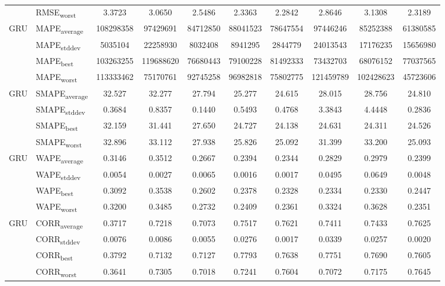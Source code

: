 {\begin{longtable}{l l c c c c c c c c}
 & RMSE\textsubscript{worst} & 3.3723 & 3.0650 & 2.5486 & 2.3363 & 2.2842 & 2.8646 & 3.1308 & 2.3189 \\
\cmidrule(lr){2-10}
\multirow{4}{*}{GRU} & MAPE\textsubscript{average} & 108298358 & 97429691 & 84712850 & 88041523 & 78647554 & 97446246 & 85252388 & 61380585 \\
 & MAPE\textsubscript{stddev} & 5035104 & 22258930 & 8032408 & 8941295 & 2844779 & 24013543 & 17176235 & 15656980 \\
 & MAPE\textsubscript{best} & 103263255 & 119688620 & 76680443 & 79100228 & 81492333 & 73432703 & 68076152 & 77037565 \\
 & MAPE\textsubscript{worst} & 113333462 & 75170761 & 92745258 & 96982818 & 75802775 & 121459789 & 102428623 & 45723606 \\
\cmidrule(lr){2-10}
\multirow{4}{*}{GRU} & SMAPE\textsubscript{average} & 32.527 & 32.277 & 27.794 & 25.277 & 24.615 & 28.015 & 28.756 & 24.810 \\
 & SMAPE\textsubscript{stddev} & 0.3684 & 0.8357 & 0.1440 & 0.5493 & 0.4768 & 3.3843 & 4.4448 & 0.2836 \\
 & SMAPE\textsubscript{best} & 32.159 & 31.441 & 27.650 & 24.727 & 24.138 & 24.631 & 24.311 & 24.526 \\
 & SMAPE\textsubscript{worst} & 32.896 & 33.112 & 27.938 & 25.826 & 25.092 & 31.399 & 33.200 & 25.093 \\
\cmidrule(lr){2-10}
\multirow{4}{*}{GRU} & WAPE\textsubscript{average} & 0.3146 & 0.3512 & 0.2667 & 0.2394 & 0.2344 & 0.2829 & 0.2979 & 0.2399 \\
 & WAPE\textsubscript{stddev} & 0.0054 & 0.0027 & 0.0065 & 0.0016 & 0.0017 & 0.0495 & 0.0649 & 0.0048 \\
 & WAPE\textsubscript{best} & 0.3092 & 0.3538 & 0.2602 & 0.2378 & 0.2328 & 0.2334 & 0.2330 & 0.2447 \\
 & WAPE\textsubscript{worst} & 0.3200 & 0.3485 & 0.2732 & 0.2409 & 0.2361 & 0.3324 & 0.3628 & 0.2351 \\
\cmidrule(lr){2-10}
\multirow{4}{*}{GRU} & CORR\textsubscript{average} & 0.3717 & 0.7218 & 0.7073 & 0.7517 & 0.7621 & 0.7411 & 0.7433 & 0.7625 \\
 & CORR\textsubscript{stddev} & 0.0076 & 0.0086 & 0.0055 & 0.0276 & 0.0017 & 0.0339 & 0.0257 & 0.0020 \\
 & CORR\textsubscript{best} & 0.3792 & 0.7132 & 0.7127 & 0.7793 & 0.7638 & 0.7751 & 0.7690 & 0.7605 \\
 & CORR\textsubscript{worst} & 0.3641 & 0.7305 & 0.7018 & 0.7241 & 0.7604 & 0.7072 & 0.7175 & 0.7645 \\

\end{longtable}}
